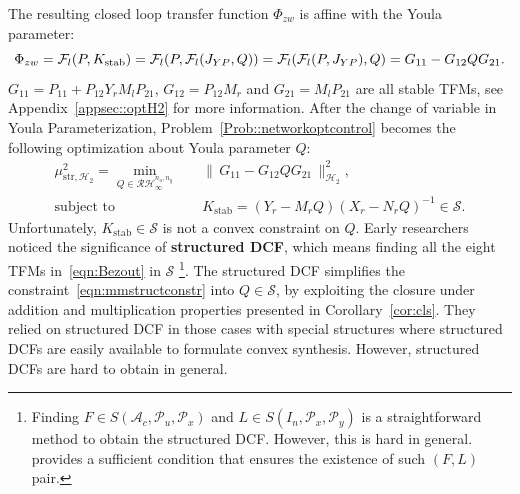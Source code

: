 The resulting closed loop transfer function \(\Phi_{zw}\) is affine with the Youla parameter:
\begin{equation}
\Phi_{zw} = {\mathcal{F}_l}(P,K_\mathrm{stab}) = {\mathcal{F}_l}(P,{\mathcal{F}_l}(J_{YP},Q))\\
= {\mathcal{F}_l}({\mathcal{F}_l}(P,J_{YP}),Q) = G_{11} -G_{12} Q G_{21}.    
\end{equation}
\(G_{11} = P_{11} + P_{12} Y_r M_l P_{21}\), \(G_{12} = P_{12} M_r\) and \(G_{21} = M_l P_{21}\) are all stable TFMs, see Appendix~\ref{appsec::optH2} for more information. After the change of variable in Youla Parameterization, Problem~\ref{Prob::networkoptcontrol} becomes the following optimization about Youla parameter \(Q\):
\begin{equation}\label{eqn::YoulaNonQI}
\begin{split}
    \mu_{\mathrm{str}, \mathcal{H}_2}^2 = \min_{Q \in \mathcal{RH}_\infty^{n_u,n_y}} \quad & 
        \|\, G_{11} - G_{12} Q G_{21} \,\|_{\mathcal{H}_2}^2,\\
    \text{subject to}\quad & K_\mathrm{stab} = (Y_r - M_r Q) (X_r - N_r Q)^{-1} \in \mathcal{S}.
\end{split}
\end{equation}
Unfortunately, \(K_\mathrm{stab} \in \mathcal{S}\) is not a convex constraint on \(Q\).
Early researchers noticed the significance of \textbf{structured DCF}, which means finding all the eight TFMs in~\eqref{eqn:Bezout} in \(\mathcal{S}\) 
\footnote{Finding \(F\in S(\mathcal{A}_c,\mathcal{P}_u,\mathcal{P}_x)\) and \(L\in S(I_n,\mathcal{P}_x,\mathcal{P}_y)\) is a straightforward method to obtain the structured DCF. However, this is hard in general. \cite{Vamsi_Realizable} provides a sufficient condition that ensures the existence of such \((F,L)\) pair.}.
The structured DCF simplifies the constraint~\eqref{eqn:mmstructconstr} into \(Q \in \mathcal{S}\), by exploiting the closure under addition and multiplication properties presented in Corollary~\ref{cor:cls}. They relied on structured DCF in those cases with special structures where structured DCFs are easily available to formulate convex synthesis. However, structured DCFs are hard to obtain in general.

